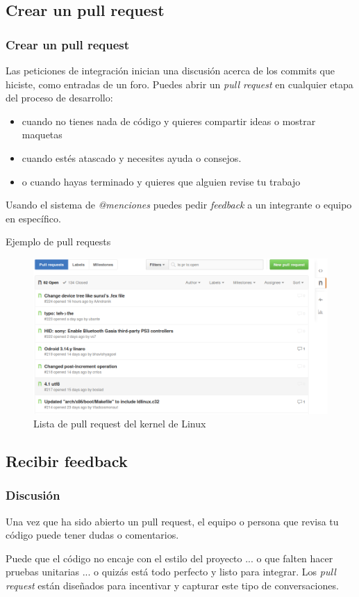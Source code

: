 \documentclass[10pt]{beamer}
\begin{document}
\subsection{Crear un pull request}
\begin{frame}[fragile]
	\frametitle{Crear un pull request}

	Las peticiones de integración inician una discusión acerca de los commits 
	que hiciste, como entradas de un foro. Puedes abrir un \emph{pull request} 
	en cualquier etapa del proceso de desarrollo:
	\begin{itemize}[<+(1)->]
		\item cuando no tienes nada de código y quieres compartir ideas o 
			mostrar maquetas
		\item cuando estés atascado y necesites ayuda o consejos.
		\item o cuando hayas terminado y quieres que alguien revise tu trabajo
	\end{itemize}
	\pause
	Usando el sistema de \emph{@menciones} puedes pedir \textit{feedback} a un 
	integrante o equipo en específico.
\end{frame}

\begin{frame}{Ejemplo de pull requests}
	\begin{figure}
		\centering
		\includegraphics[width=\textwidth]{img/pull_requests_linux.png}
		\caption{Lista de pull request del kernel de Linux}
	\end{figure}
\end{frame}

\subsection{Recibir feedback}
\begin{frame}[fragile]
	\frametitle{Discusión}

	Una vez que ha sido abierto un pull request, el equipo o persona que revisa 
	tu código puede tener dudas o comentarios.

	\pause Puede que el código no encaje con el estilo del proyecto \pause... o 
	que falten hacer pruebas unitarias \pause... o quizás está todo perfecto y 
	listo para integrar.
	\pause
	Los \textit{pull request} están diseñados para incentivar y capturar este 
	tipo de conversaciones.
\end{frame}
\end{document}
